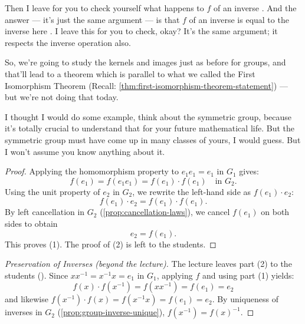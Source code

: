 \begin{speech}[01:00:00 - 01:01:12]
Then I leave for you to check yourself what happens to $f$ of an inverse . And the answer --- it's just the same argument --- is that $f$ of an inverse is equal to the inverse here . I leave this for you to check, okay? It's the same argument; it respects the inverse operation also.

So, we're going to study the kernels and images just as before for groups, and that'll lead to a theorem which is parallel to what we called the First Isomorphism Theorem (Recall: \cref{thm:first-isomorphism-theorem-statement}) --- but we're not doing that today.

I thought I would do some example, think about the symmetric group, because it's totally crucial to understand that for your future mathematical life. But the symmetric group must have come up in many classes of yours, I would guess. But I won't assume you know anything about it. 
\end{speech}

\begin{content}

\begin{proof}
Applying the homomorphism property to $e_1 e_1 = e_1$ in $G_1$ gives:
\[
f(e_1) = f(e_1 e_1) = f(e_1) \cdot f(e_1) \quad \text{in } G_2.
\]
Using the unit property of $e_2$ in $G_2$, we rewrite the left-hand side as $f(e_1) \cdot e_2$:
\[
f(e_1) \cdot e_2 = f(e_1) \cdot f(e_1).
\]
By left cancellation in $G_2$ (\cref{prop:cancellation-laws}), we cancel $f(e_1)$ on both sides to obtain
\[
e_2 = f(e_1).
\]
This proves (1). The proof of (2) is left to the students.
\end{proof}

\begin{proof}[Preservation of Inverses (beyond the lecture)]
The lecture leaves part (2) to the students (). Since $x x^{-1} = x^{-1} x = e_1$ in $G_1$, applying $f$ and using part (1) yields:
\[
f(x) \cdot f(x^{-1}) = f(x x^{-1}) = f(e_1) = e_2
\]
and likewise $f(x^{-1}) \cdot f(x) = f(x^{-1} x) = f(e_1) = e_2$. By uniqueness of inverses in $G_2$ (\cref{prop:group-inverse-unique}), $f(x^{-1}) = f(x)^{-1}$.
\end{proof}
\end{content}

